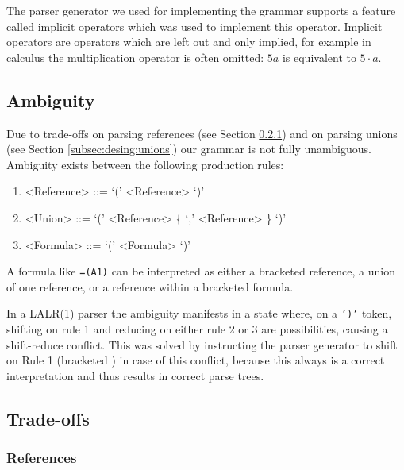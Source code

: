 \documentclass[times]{smrauth}
\begin{document}
The parser generator we used for implementing the grammar supports a feature called implicit operators which was used to implement this operator.
Implicit operators are operators which are left out and only implied, for example in calculus the multiplication operator is often omitted: $5a$ is equivalent to $5 \cdot a$.

\subsection{Ambiguity}
\label{sec:ambiguity}

Due to trade-offs on parsing references (see Section \ref{tradeoff:references}) and on parsing unions (see Section \ref{subsec:desing:unions}) our grammar is not fully unambiguous.
Ambiguity exists between the following production rules:
\begin{enumerate}
	\item \begin{grammar}<Reference> ::= `(' <Reference> `)'\end{grammar}
	\item \begin{grammar}<Union> ::= `(' <Reference> \{ `,' <Reference> \} `)'\end{grammar}
	\item \begin{grammar}<Formula> ::= `(' <Formula> `)'\end{grammar}
\end{enumerate}

A formula like \texttt{=(A1)} can be interpreted as either a bracketed reference, a union of one reference, or a reference within a bracketed formula.

In a LALR(1) parser the ambiguity manifests in a state where, on a \texttt{')'} token, shifting on rule 1 and reducing on either rule 2 or 3 are possibilities, causing a shift-reduce conflict.
This was solved by instructing the parser generator to shift on Rule 1 (bracketed ) in case of this conflict, because this always is a correct interpretation and thus results in correct parse trees.

\subsection{Trade-offs}

\subsubsection{\textbf{References}}
\label{tradeoff:references}
\end{document}
